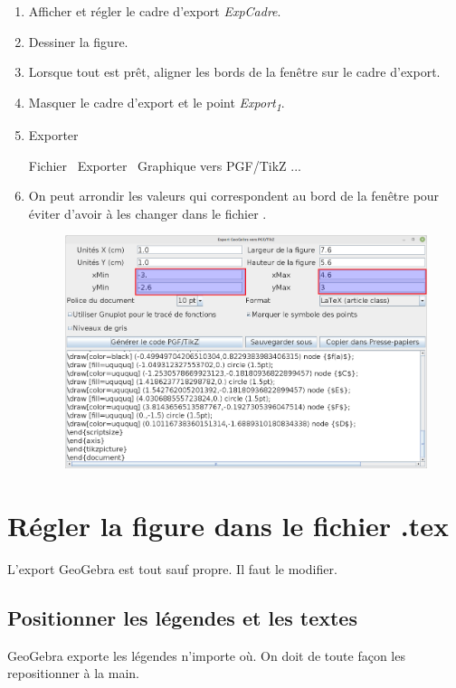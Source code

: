 \documentclass[10pt,a4paper]{report}
\begin{document}
\begin{enumerate}
	\item Afficher et régler le cadre d'export \emph{ExpCadre}.
	\item Dessiner la figure.
	\item Lorsque tout est prêt, aligner les bords de la fenêtre sur le cadre d'export.
	\item Masquer le cadre d'export et le point \emph{Export\textsubscript{1}}.
	\item Exporter
		\begin{center}
			Fichier \textrightarrow \ Exporter \textrightarrow \ Graphique vers PGF/TikZ ... 
		\end{center}
	\item On peut arrondir les valeurs qui correspondent au bord de la fenêtre pour éviter d'avoir à les changer dans le fichier .
		\begin{figure}[H]
			\centering
			\includegraphics[width=.6\linewidth]{captures/interface_geogebra_export}
			\caption{}
			\label{fig:interface_geogebra_export}
		\end{figure}
\end{enumerate}





\section{Régler la figure dans le fichier .tex}

L'export GeoGebra est tout sauf propre. Il faut le modifier.


\subsection{Positionner les légendes et les textes}

GeoGebra exporte les légendes n'importe où. On doit de toute façon les repositionner à la main.
\end{document}

